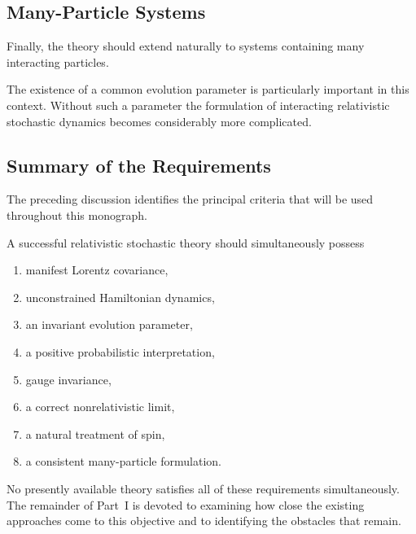 \subsection{Many-Particle Systems}

Finally, the theory should extend naturally to systems containing many
interacting particles.

The existence of a common evolution parameter is particularly important
in this context. Without such a parameter the formulation of interacting
relativistic stochastic dynamics becomes considerably more complicated.

\subsection{Summary of the Requirements}

The preceding discussion identifies the principal criteria that will be
used throughout this monograph.

A successful relativistic stochastic theory should simultaneously
possess

\begin{enumerate}

\item manifest Lorentz covariance,

\item unconstrained Hamiltonian dynamics,

\item an invariant evolution parameter,

\item a positive probabilistic interpretation,

\item gauge invariance,

\item a correct nonrelativistic limit,

\item a natural treatment of spin,

\item a consistent many-particle formulation.

\end{enumerate}

No presently available theory satisfies all of these requirements
simultaneously. The remainder of Part~I is devoted to examining how
close the existing approaches come to this objective and to identifying
the obstacles that remain.



